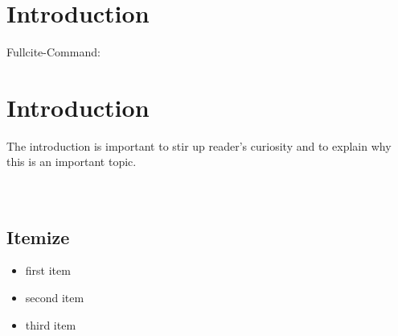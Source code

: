 
\chapter{Introduction}\label{chapterIntroduction}

\cite[635-637]{Beck1995}

\cite[430]{Putnam1988}

Fullcite-Command:

\chapter{Introduction}\label{chapterIntroduction}

The introduction is important to stir up reader's curiosity and to explain why this is an important topic.\\
\ \\
\ \\


\blindtext




\section{Itemize}

\begin{itemize}
	\item first item
	\item second item
	\item third item
\end{itemize}